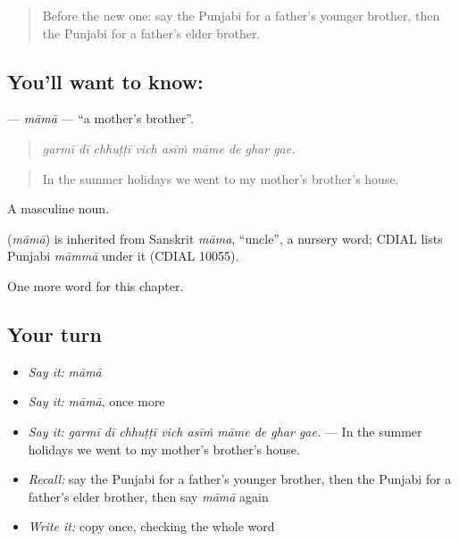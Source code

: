 \label{lesson:PA-C331-mama}



\begin{quote}
Before the new one: say the Punjabi for a father's younger brother, then the Punjabi for a father's elder brother.
\end{quote}

\subsection*{You'll want to know: }
\textbf{} — \emph{māmā} — \textquotedblleft{}a mother's brother\textquotedblright{}.

\begin{quote}
        
\end{quote}

\begin{quote}
\emph{garmī dī chhuṭṭī vich asīṁ māme de ghar gae.}
\end{quote}

\begin{quote}
In the summer holidays we went to my mother's brother's house.
\end{quote}

A masculine noun.

\begin{cousinweb}
\textbf{} (\emph{māmā}) is inherited from Sanskrit \emph{māma}, \textquotedblleft{}uncle\textquotedblright{}, a nursery word; CDIAL lists Punjabi \emph{māmmā} under it (CDIAL 10055).
\end{cousinweb}

\begin{grammarlens}[title={What you've built}]
One more word for this chapter.
\end{grammarlens}

\subsection*{Your turn}
\begin{itemize}
\raggedright
  \item \emph{Say it:} \emph{māmā}
  \item \emph{Say it:} \emph{māmā}, once more
  \item \emph{Say it:} \emph{garmī dī chhuṭṭī vich asīṁ māme de ghar gae.} — In the summer holidays we went to my mother's brother's house.
  \item \emph{Recall:} say the Punjabi for a father's younger brother, then the Punjabi for a father's elder brother, then say \emph{māmā} again
  \item \emph{Write it:} copy \textbf{} once, checking the whole word
\end{itemize}

